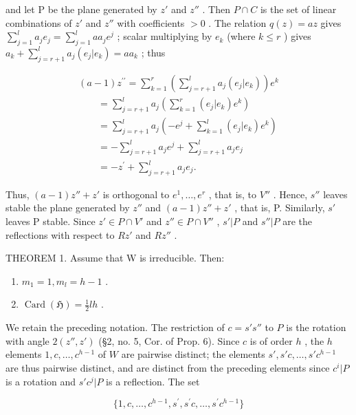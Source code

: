 and let P be the plane generated by \(z'\) and \(z''\) . Then \(P \cap C\) is the set of linear combinations of \(z'\) and \(z''\) with coefficients \(> 0\) . The relation \(q(z) = az\) gives \(\sum_{j=1}^{l} a_j e_j = \sum_{j=1}^{l} aa_j e^j\) ; scalar multiplying by \(e_k\) (where \(k \leqslant r\) ) gives \(a_k + \sum_{j=r+1}^{l} a_j (e_j | e_k) = aa_k\) ; thus

\[
\begin{array}{l} (a - 1) z ^ {\prime \prime} = \sum_ {k = 1} ^ {r} \left(\sum_ {j = r + 1} ^ {l} a _ {j} (e _ {j} | e _ {k})\right) e ^ {k} \\ \qquad = \sum_ {j = r + 1} ^ {l} a _ {j} \left(\sum_ {k = 1} ^ {r} (e _ {j} | e _ {k}) e ^ {k}\right) \\ \qquad = \sum_ {j = r + 1} ^ {l} a _ {j} \left(- e ^ {j} + \sum_ {k = 1} ^ {l} (e _ {j} | e _ {k}) e ^ {k}\right) \\ \qquad = - \sum_ {j = r + 1} ^ {l} a _ {j} e ^ {j} + \sum_ {j = r + 1} ^ {l} a _ {j} e _ {j} \\ \qquad = - z ^ {\prime} + \sum_ {j = r + 1} ^ {l} a _ {j} e _ {j}. \end{array}
\]

Thus, \((a-1)z'' + z'\) is orthogonal to \(e^{1}, \ldots, e^{r}\) , that is, to \(V''\) . Hence, \(s''\) leaves stable the plane generated by \(z''\) and \((a-1)z'' + z'\) , that is, P. Similarly, \(s'\) leaves P stable. Since \(z' \in P \cap V'\) and \(z'' \in P \cap V''\) , \(s'|P\) and \(s''|P\) are the reflections with respect to \(Rz'\) and \(Rz''\) .

THEOREM 1. Assume that W is irreducible. Then:

\begin{enumerate}
\def\labelenumi{(\roman{enumi})}
\item
  \(m_{1} = 1, m_{l} = h - 1\) .
\item
  \(\operatorname{Card}(\mathfrak{H}) = \frac{1}{2} lh\) .
\end{enumerate}

We retain the preceding notation. The restriction of \(c = s's''\) to \(P\) is the rotation with angle \(2(z'', z')\) (§2, no. 5, Cor. of Prop. 6). Since \(c\) is of order \(h\) , the \(h\) elements \(1, c, \ldots, c^{h-1}\) of \(W\) are pairwise distinct; the elements \(s', s'c, \ldots, s'c^{h-1}\) are thus pairwise distinct, and are distinct from the preceding elements since \(c^i |P\) is a rotation and \(s'c^j |P\) is a reflection. The set

\[
\{1, c, \dots , c ^ {h - 1}, s ^ {\prime}, s ^ {\prime} c, \dots , s ^ {\prime} c ^ {h - 1} \}
\]

